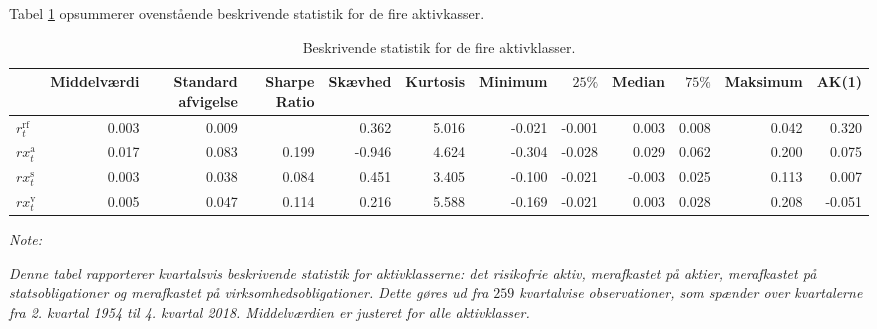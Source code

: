 \documentclass[
  a4paper,
  oneside]{memoir}
\begin{document}
Tabel \ref{tab:DES-AKTIVKLASSE} opsummerer ovenstående beskrivende statistik for de fire aktivkasser.



\begin{landscape}
\begin{table}[!h]

\caption{\label{tab:DES-AKTIVKLASSE}Beskrivende statistik for de fire aktivklasser.}
\centering
\begin{threeparttable}
\begin{tabular}[t]{lrrrrrrrrrrr}
\toprule
  & Middelværdi & Standard afvigelse & Sharpe Ratio & Skævhed & Kurtosis & Minimum & $25 \%$ & Median & $75 \%$ & Maksimum & AK(1)\\
\midrule
\rowcolor{gray!6}  $r_t^{\text{rf}}$ & 0.003 & 0.009 &  & 0.362 & 5.016 & -0.021 & -0.001 & 0.003 & 0.008 & 0.042 & 0.320\\
$rx_t^{\text{a}}$ & 0.017 & 0.083 & 0.199 & -0.946 & 4.624 & -0.304 & -0.028 & 0.029 & 0.062 & 0.200 & 0.075\\
\rowcolor{gray!6}  $rx_t^{\text{s}}$ & 0.003 & 0.038 & 0.084 & 0.451 & 3.405 & -0.100 & -0.021 & -0.003 & 0.025 & 0.113 & 0.007\\
$rx_t^{\text{v}}$ & 0.005 & 0.047 & 0.114 & 0.216 & 5.588 & -0.169 & -0.021 & 0.003 & 0.028 & 0.208 & -0.051\\
\bottomrule
\end{tabular}
\begin{tablenotes}
\item \textit{Note: } 
\item \textit{Denne tabel rapporterer kvartalsvis beskrivende statistik for aktivklasserne: det risikofrie aktiv, merafkastet på aktier, merafkastet på statsobligationer og merafkastet på virksomhedsobligationer. Dette gøres ud fra $259$ kvartalvise observationer, som spænder over kvartalerne fra 2. kvartal 1954 til 4. kvartal 2018. Middelværdien er justeret for alle aktivklasser.}
\end{tablenotes}
\end{threeparttable}
\end{table}

\begin{table}[!h]


\end{table}
\end{landscape}
\end{document}
